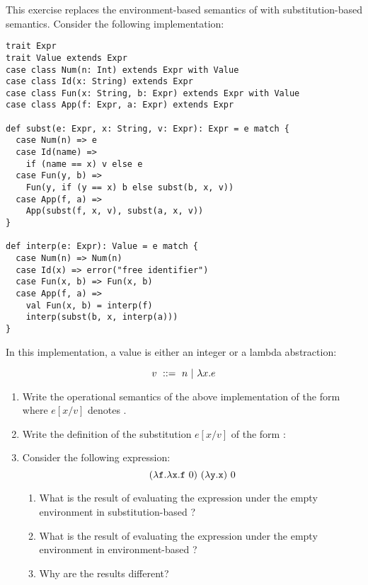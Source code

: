 \begin{exercise}

This exercise replaces the environment-based semantics of \Lang with
substitution-based semantics.
Consider the following implementation:
\begin{verbatim}
trait Expr
trait Value extends Expr
case class Num(n: Int) extends Expr with Value
case class Id(x: String) extends Expr
case class Fun(x: String, b: Expr) extends Expr with Value
case class App(f: Expr, a: Expr) extends Expr

def subst(e: Expr, x: String, v: Expr): Expr = e match {
  case Num(n) => e
  case Id(name) =>
    if (name == x) v else e
  case Fun(y, b) =>
    Fun(y, if (y == x) b else subst(b, x, v))
  case App(f, a) =>
    App(subst(f, x, v), subst(a, x, v))
}

def interp(e: Expr): Value = e match {
  case Num(n) => Num(n)
  case Id(x) => error("free identifier")
  case Fun(x, b) => Fun(x, b)
  case App(f, a) =>
    val Fun(x, b) = interp(f)
    interp(subst(b, x, interp(a)))
}
\end{verbatim}

In this implementation, a value is either an integer or a lambda abstraction:

\[ v\ ::=\ n\ |\ \lambda x.e \]

\begin{enumerate}
  \item
    Write the operational semantics of the above implementation
    of the form 
    where $e[x/v]$ denotes .

  \item Write the definition of the substitution $e[x/v]$
    of the form :

  \item Consider the following expression:
\[
  (\lambda\texttt{f}.\lambda\texttt{x}.\texttt{f}\ 0)\ (\lambda\texttt{y}.\texttt{x})\ 0
\]

\begin{enumerate}
\item What is the result of evaluating the expression under the empty
  environment in substitution-based \Lang?
\item What is the result of evaluating the expression under the empty
  environment in environment-based \Lang?
\item Why are the results different?
\end{enumerate}


\end{enumerate}
\end{exercise}
